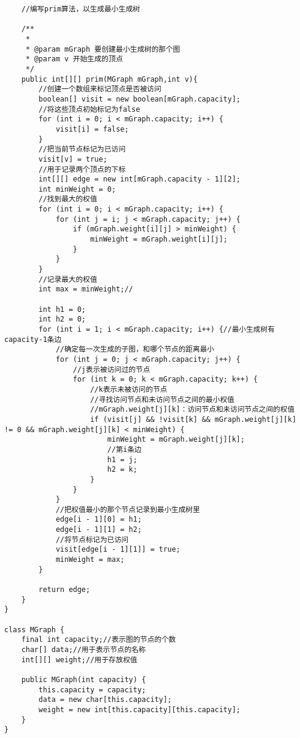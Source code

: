 \documentclass[a4paper]{report}
\begin{document}
\begin{lstlisting}
    //编写prim算法，以生成最小生成树

    /**
     *
     * @param mGraph 要创建最小生成树的那个图
     * @param v 开始生成的顶点
     */
    public int[][] prim(MGraph mGraph,int v){
        //创建一个数组来标记顶点是否被访问
        boolean[] visit = new boolean[mGraph.capacity];
        //将这些顶点初始标记为false
        for (int i = 0; i < mGraph.capacity; i++) {
            visit[i] = false;
        }
        //把当前节点标记为已访问
        visit[v] = true;
        //用于记录两个顶点的下标
        int[][] edge = new int[mGraph.capacity - 1][2];
        int minWeight = 0;
        //找到最大的权值
        for (int i = 0; i < mGraph.capacity; i++) {
            for (int j = i; j < mGraph.capacity; j++) {
                if (mGraph.weight[i][j] > minWeight) {
                    minWeight = mGraph.weight[i][j];
                }
            }
        }
        //记录最大的权值
        int max = minWeight;//

        int h1 = 0;
        int h2 = 0;
        for (int i = 1; i < mGraph.capacity; i++) {//最小生成树有capacity-1条边
            //确定每一次生成的子图，和哪个节点的距离最小
            for (int j = 0; j < mGraph.capacity; j++) {
                //j表示被访问过的节点
                for (int k = 0; k < mGraph.capacity; k++) {
                    //k表示未被访问的节点
                    //寻找访问节点和未访问节点之间的最小权值
                    //mGraph.weight[j][k]：访问节点和未访问节点之间的权值
                    if (visit[j] && !visit[k] && mGraph.weight[j][k] != 0 && mGraph.weight[j][k] < minWeight) {
                        minWeight = mGraph.weight[j][k];
                        //第i条边
                        h1 = j;
                        h2 = k;
                    }
                }
            }
            //把权值最小的那个节点记录到最小生成树里
            edge[i - 1][0] = h1;
            edge[i - 1][1] = h2;
            //将节点标记为已访问
            visit[edge[i - 1][1]] = true;
            minWeight = max;
        }

        return edge;
    }
}

class MGraph {
    final int capacity;//表示图的节点的个数
    char[] data;//用于表示节点的名称
    int[][] weight;//用于存放权值

    public MGraph(int capacity) {
        this.capacity = capacity;
        data = new char[this.capacity];
        weight = new int[this.capacity][this.capacity];
    }
}

\end{lstlisting}
\end{document}
